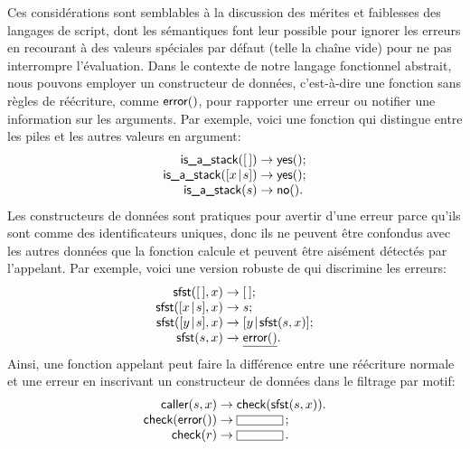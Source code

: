 Ces considérations sont semblables à la discussion des mérites et
faiblesses des langages de script, dont les sémantiques font leur
possible pour ignorer les erreurs en recourant à des valeurs spéciales
par défaut (telle la chaîne vide) pour ne pas interrompre
l'évaluation. Dans le contexte de notre langage fonctionnel abstrait,
nous pouvons employer un constructeur de données, c'est-à-dire une
fonction sans règles de réécriture, comme \(\textsf{error}()\), pour
rapporter une erreur ou notifier une information sur les
arguments. Par exemple, voici une fonction qui distingue entre les
piles et les autres valeurs en argument:
\begin{equation*}
\begin{array}{r@{\;}l@{\;}l}
\fun{is\_a\_stack}(\el) & \rightarrow & \fun{yes}();\\
\fun{is\_a\_stack}(\cons{x}{s}) & \rightarrow & \fun{yes}();\\
\fun{is\_a\_stack}(s) & \rightarrow & \fun{no}().
\end{array}
\end{equation*}
Les constructeurs de données sont pratiques pour avertir d'une erreur
parce qu'ils sont comme des identificateurs uniques, donc ils ne
peuvent être confondus avec les autres données que la fonction calcule
et peuvent être aisément détectés par l'appelant. Par exemple, voici
une version robuste de  qui discrimine
les erreurs:
\begin{equation*}
\begin{array}{r@{\;}l@{\;}l}
\fun{sfst}(\el, x) & \rightarrow & \el;\\
\fun{sfst}(\cons{x}{s},x) & \rightarrow & s;\\
\fun{sfst}(\cons{y}{s},x) & \rightarrow & \cons{y}{\fun{sfst}(s,x)};\\
\fun{sfst}(s,x) & \rightarrow & \underline{\fun{error}()}.
\end{array}
\end{equation*}
Ainsi, une fonction appelant  peut faire la différence
entre une réécriture normale et une erreur en inscrivant un
constructeur de données dans le filtrage par motif:
\begin{equation*}
\begin{array}{r@{\;}l@{\;}l}
\fun{caller}(s,x) & \rightarrow & \fun{check}(\fun{sfst}(s,x)).\\
\fun{check}(\fun{error}()) & \rightarrow & \fbcode{CCCCC}\,;\\
\fun{check}(r) & \rightarrow & \fbcode{CCCCC}\,.
\end{array}
\end{equation*}

